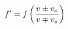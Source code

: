 \documentclass[preview]{standalone}
\begin{document}
\begin{align*}
\special{dvisvgm:raw <g id='unique000'>}f' = f\left(\frac{v \pm v_o}{v \mp v_s}\right)\special{dvisvgm:raw </g>}
\end{align*}
\end{document}
